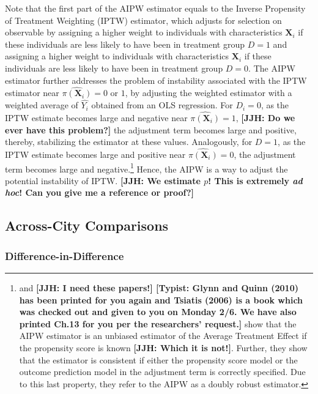 Note that the first part of the AIPW estimator equals to the Inverse Propensity of Treatment Weighting (IPTW) estimator, which adjusts for selection on observable by assigning a higher weight to individuals with characteristics $\boldsymbol{X}_i$ if these individuals are less likely to have been in treatment group $D = 1$ and assigning a higher weight to individuals with characteristics $\boldsymbol{X}_i$ if these individuals are less likely to have been in treatment group $D = 0$. The AIPW estimator further addresses the problem of instability associated with the IPTW estimator near $\hat{\pi(\boldsymbol{X}_i)} = 0$ or $1$, by adjusting the weighted estimator with a weighted average of $\hat{Y_i}$ obtained from an OLS regression. For $D_i = 0$, as the IPTW estimate becomes large and negative near $\hat{\pi(\boldsymbol{X}_i)} = 1$, \textbf{[JJH: Do we ever have this problem?]} the adjustment term becomes large and positive, thereby, stabilizing the estimator at these values. Analogously, for $D = 1$, as the IPTW estimate becomes large and positive near $\hat{\pi(\boldsymbol{X}_i)} = 0$, the adjustment term becomes large and negative.\footnote{\citet{Tsiatis_2006_Semiparametric-Theory} and \citet{Glynn-Quinn_2010_Political-Analysis} \textbf{[JJH: I need these papers!] [Typist: Glynn and Quinn (2010) has been printed for you again and Tsiatis (2006) is a book which was checked out and given to you on Monday 2/6. We have also printed Ch.13 for you per the researchers' request.]} show that the AIPW estimator is an unbiased estimator of the Average Treatment Effect if the propensity score is known \textbf{[JJH: Which it is not!]}. Further, they show that the estimator is consistent if either the propensity score model or the outcome prediction model in the adjustment term is correctly specified. Due to this last property, they refer to the AIPW as a doubly robust estimator.}  Hence, the AIPW is a way to adjust the potential instability of IPTW. \textbf{[JJH: We estimate $p$! This is extremely \emph{ad hoc}! Can you give me a reference or proof?]}


\subsection{Across-City Comparisons} \label{sec:across-city-analysis}
\subsubsection{Difference-in-Difference}  \label{subsubsection:DID}

